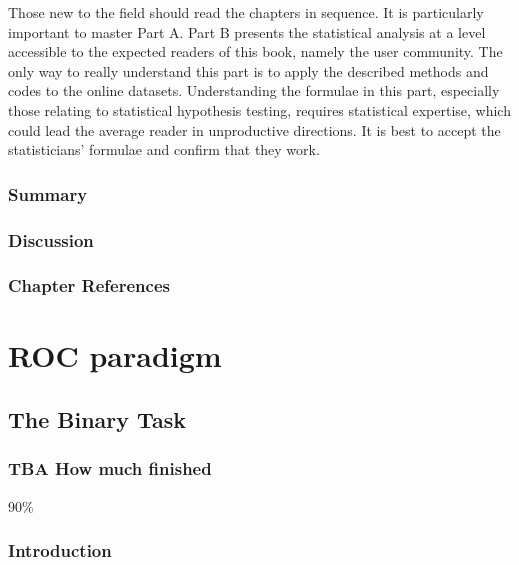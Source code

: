 \documentclass[
]{book}
\begin{document}
Those new to the field should read the chapters in sequence. It is particularly important to master Part A. Part B presents the statistical analysis at a level accessible to the expected readers of this book, namely the user community. The only way to really understand this part is to apply the described methods and codes to the online datasets. Understanding the formulae in this part, especially those relating to statistical hypothesis testing, requires statistical expertise, which could lead the average reader in unproductive directions. It is best to accept the statisticians' formulae and confirm that they work.

\hypertarget{overview-Summary}{%
\section{Summary}\label{overview-Summary}}

\hypertarget{overview-Discussion}{%
\section{Discussion}\label{overview-Discussion}}

\hypertarget{overview-references}{%
\section{Chapter References}\label{overview-references}}

\hypertarget{part-roc-paradigm}{%
\part*{ROC paradigm}\label{part-roc-paradigm}}

\hypertarget{binary-task}{%
\chapter{The Binary Task}\label{binary-task}}

\hypertarget{binary-task-how-much-finished}{%
\section{TBA How much finished}\label{binary-task-how-much-finished}}

90\%

\hypertarget{binary-taskIntro}{%
\section{Introduction}\label{binary-taskIntro}}
\end{document}
